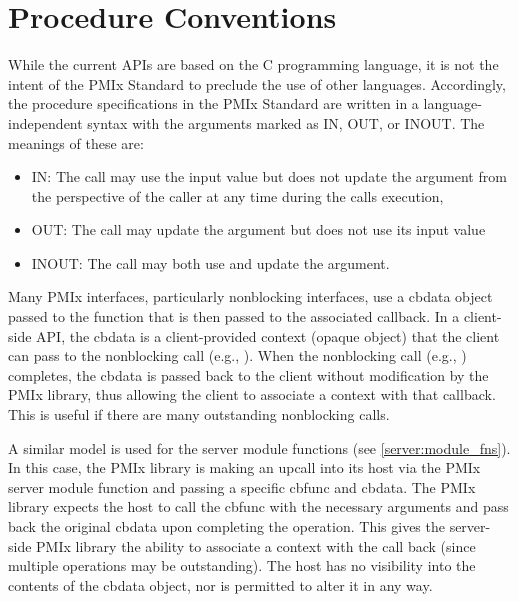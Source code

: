 \section{Procedure Conventions}

While the current \acp{API} are based on the C programming language, it is not the intent of the \ac{PMIx} Standard to preclude the use of other languages.
Accordingly, the procedure specifications in the \ac{PMIx} Standard are written in a language-independent syntax with the arguments marked as IN, OUT, or INOUT.
The meanings of these are:
\begin{itemize}
\item IN:
The call may use the input value but does not update the argument from the perspective of the caller at any time during the calls execution,
\item OUT:
The call may update the argument but does not use its input value
\item INOUT:
The call may both use and update the argument.
\end{itemize}

Many \ac{PMIx} interfaces, particularly nonblocking interfaces, use a cbdata object passed to the function that is then passed to the associated callback. In a client-side \ac{API}, the cbdata is a client-provided context (opaque object) that the client can pass to the nonblocking call (e.g., ). When the nonblocking call (e.g., ) completes, the cbdata is passed back to the client without modification by the \ac{PMIx} library, thus allowing the client to associate a context with that callback. This is useful if there are many outstanding nonblocking calls.

A similar model is used for the server module functions (see \ref{server:module_fns}). In this case, the \ac{PMIx} library is making an upcall into its host via the \ac{PMIx} server module function and passing a specific cbfunc and cbdata. The \ac{PMIx} library expects the host to call the cbfunc with the necessary arguments and pass back the original cbdata upon completing the operation. This gives the server-side \ac{PMIx} library the ability to associate a context with the call back (since multiple operations may be outstanding). The host has no visibility into the contents of the cbdata object, nor is permitted to alter it in any way.
